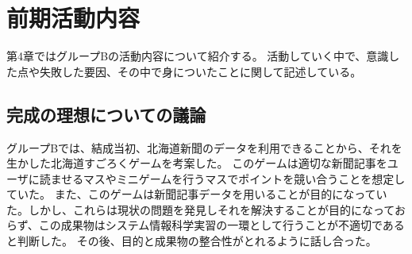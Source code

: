 \chapter{前期活動内容}
第4章ではグループBの活動内容について紹介する。
活動していく中で、意識した点や失敗した要因、その中で身についたことに関して記述している。

\section{完成の理想についての議論}
グループBでは、結成当初、北海道新聞のデータを利用できることから、それを生かした北海道すごろくゲームを考案した。
このゲームは適切な新聞記事をユーザに読ませるマスやミニゲームを行うマスでポイントを競い合うことを想定していた。
また、このゲームは新聞記事データを用いることが目的になっていた。しかし、これらは現状の問題を発見しそれを解決することが目的になっておらず、この成果物はシステム情報科学実習の一環として行うことが不適切であると判断した。
その後、目的と成果物の整合性がとれるように話し合った。


